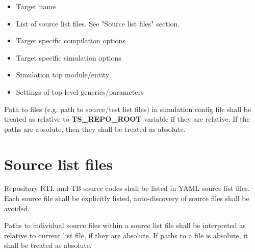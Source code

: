 \documentclass{tropic_design_spec}
\begin{document}

\begin{itemize}
	\item{Target name}
	\item{List of source list files. See "Source list files" section.}
	\item{Target specific compilation options}
	\item{Target specific simulation options}
	\item{Simulation top module/entity}
	\item{Settings of top level generics/parameters}
\end{itemize}


    {Path to files (e.g. path to source/test list files) in simulation config file shall
     be treated as relative to \textbf{TS_REPO_ROOT} variable if they are relative. If
     the paths are absolute, then they shall be treated as absolute.}
            

\ReqEnd



\pagebreak
\section{Source list files}



    {Repository RTL and TB source codes shall be listed in YAML source list files. Each
     source file shall be explicitly listed, auto-discovery of source files shall be
     avoided}.


    {Paths to individual source files within a source list file shall be interpreted as
     relative to current list file, if they are absolute. If paths to a file is absolute,
     it shall be treated as absolute.}
\end{document}

